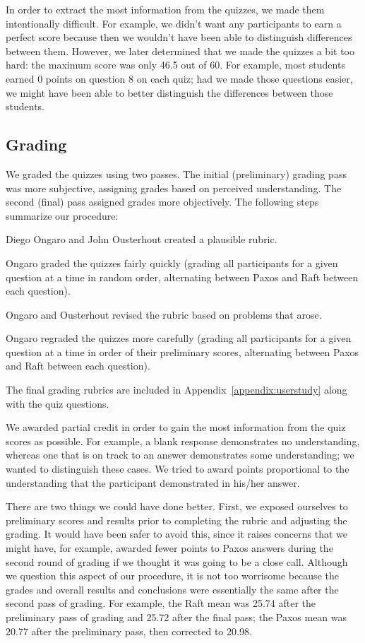 In order to extract the most information from the quizzes, we made them
intentionally difficult. For example, we didn't want any participants to
earn a perfect score because then we wouldn't have been able to
distinguish differences between them. However, we later determined that
we made the quizzes a bit too hard: the maximum score was only 46.5 out
of 60. For example, most students earned 0 points on question 8 on
each quiz; had we made those questions easier, we might have been able
to better distinguish the differences between those students.

\subsection{Grading}
\label{userstudy:methodsdiscussion:grading}

We graded the quizzes using two passes. The initial (preliminary)
grading pass was more subjective, assigning grades based on perceived
understanding. The second (final) pass assigned
grades more objectively. The following steps summarize our
procedure:
\begin{compactenum}
\item Diego Ongaro and John Ousterhout created a plausible rubric.
\item Ongaro graded the quizzes fairly quickly (grading all participants
for a given question at a time in random order, alternating between
Paxos and Raft between each question).
\item Ongaro and Ousterhout revised the rubric based on problems that
arose.
\item Ongaro regraded the quizzes more carefully (grading all
participants for a given question at a time in order of
their preliminary scores, alternating between Paxos and
Raft between each question).
\end{compactenum}
The final grading rubrics are included in Appendix~\ref{appendix:userstudy}
along with the quiz questions.

We awarded partial credit in order to gain the most information from the
quiz scores as possible. For example, a blank response demonstrates no
understanding, whereas one that is on track to an answer demonstrates
some understanding; we wanted to distinguish these cases. We tried to
award points proportional to the understanding that the participant
demonstrated in his/her answer.

There are two things we could have done better. First, we exposed
ourselves to preliminary scores and results prior to completing the rubric and
adjusting the grading. It
would have been safer to avoid this, since it raises concerns that we
might have, for example, awarded fewer points to Paxos answers during the
second round of grading if we thought it was going to be a close call.
Although we question this aspect of our procedure, it is not too
worrisome because the grades and overall results and conclusions
were essentially the same after the second pass of grading. 
For example, the Raft mean was 25.74 after the preliminary pass of
grading and 25.72 after the final pass; the Paxos mean was
20.77 after the preliminary pass, then corrected to 20.98.

